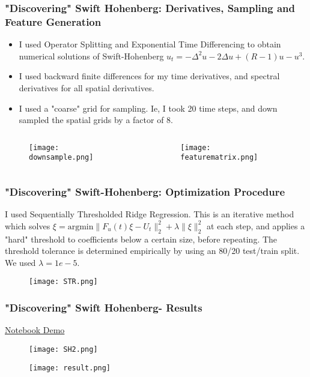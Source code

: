\documentclass[]{beamer}
\begin{document}
\begin{frame}
     \frametitle{"Discovering" Swift Hohenberg: Derivatives, Sampling and Feature Generation}
     \begin{itemize}
         \item I used Operator Splitting and Exponential Time Differencing to obtain numerical solutions of Swift-Hohenberg $u_t = -\Delta^2 u - 2\Delta u + (R-1)u - u^3.$ 
        \item I used backward finite differences for my time derivatives, and spectral derivatives for all spatial derivatives.
        \item I used a "coarse" grid for sampling. Ie, I took 20 time steps, and down sampled the spatial grids by a factor of 8.
    \end{itemize}
    \begin{columns}[c]
        \begin{column}{.5\textwidth}
            \begin{figure}
                \centering
                \texttt{[image: downsample.png]}
            \end{figure}
        \end{column}
        \begin{column}{.5\textwidth}
            \begin{figure}
                \centering
                \texttt{[image: featurematrix.png]}
            \end{figure}
        \end{column}
    \end{columns}
\end{frame}

\begin{frame}
    \frametitle{"Discovering" Swift-Hohenberg: Optimization Procedure}
     I used Sequentially Thresholded Ridge Regression. This is an iterative method which solves $\xi = \text{argmin}\|F_u(t)\xi-U_t\|_2^2 + \lambda \|\xi\|_2^2$ at each step, and applies a "hard" threshold to coefficients below a certain size, before repeating. The threshold tolerance is determined empirically by using an 80/20 test/train split. We used $\lambda = 1e-5$.
      \begin{figure}
        \centering
        \texttt{[image: STR.png]}
    \end{figure}
\end{frame}

\begin{frame}
     \frametitle{"Discovering" Swift Hohenberg- Results}
        \href{https://github.com/EMcDugald/convection_patterns_wip/blob/master/code/ml_experiments/my_experiments/phase_surface.ipynb}{Notebook Demo}
      \begin{figure}
        \centering
        \texttt{[image: SH2.png]}
        \end{figure}
     \begin{figure}
        \centering
        \texttt{[image: result.png]}
        \end{figure}
\end{frame}
\end{document}
